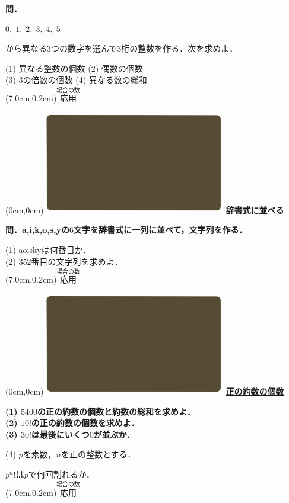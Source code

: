 \documentclass[10pt,
fleqn,
dvipdfmx,
uplatex
]{jsarticle}
\begin{document}
\normalsize 
\bf\boldmath 問．

\Huge 
\vspace{-1zw}
\hspace{0.5zw}
$0,\;1,\;2,\;3,\;4,\;5$

\normalsize 
から異なる$3$つの数字を選んで$3$桁の整数を作る．次を求めよ．

\large
(1)  異なる整数の個数\hspace{0.1zw}
(2)  偶数の個数\\
(3)  $3$の倍数の個数\hspace{0.8zw}
(4)  異なる数の総和\\

\at(7.0cm,0.2cm){\small\color{bradorange}$\overset{\text{場合の数}}{\text{応用}}$}


\newpage



\at(0cm,0cm){\includegraphics[width=8cm,bb=0 0 1920 1080]{./youtube/thumbnails/templates/smart_background/場合の数.jpeg}}
{\color{orange}\bf\boldmath\huge\underline{辞書式に並べる}}\vspace{0.3zw}

\Large 
\bf\boldmath 問．a,\;i,\;k,\;o,\;s,\;yの$6$文字を辞書式に一列に並べて，文字列を作る．

\Large
\vspace{0.2zw}
\huge
(1) aoiskyは何番目か．\\
\Large
(2)  ${352}$番目の文字列を求めよ．\\

\at(7.0cm,0.2cm){\small\color{bradorange}$\overset{\text{場合の数}}{\text{応用}}$}


\newpage



\at(0cm,0cm){\includegraphics[width=8cm,bb=0 0 1920 1080]{./youtube/thumbnails/templates/smart_background/場合の数.jpeg}}
{\color{orange}\bf\boldmath\huge\underline{正の約数の個数}}\vspace{0.3zw}

\small 
\bf\boldmath 
(1)  ${5400}$の正の約数の個数と約数の総和を求めよ．\\
(2)  ${10}!$の正の約数の個数を求めよ．\\
(3)  ${30}!$は最後にいくつ$0$が並ぶか．

\Large
(4)  $p$を素数，$n$を正の整数とする．

\LARGE
\vspace{-0.2zw}
\hspace{1zw}$p^n!$は$p$で何回割れるか．\\

\at(7.0cm,0.2cm){\small\color{bradorange}$\overset{\text{場合の数}}{\text{応用}}$}
\end{document}
